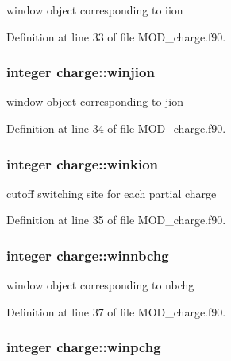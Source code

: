 window object corresponding to iion 



Definition at line 33 of file M\-O\-D\-\_\-charge.\-f90.

\hypertarget{classcharge_a8faac0f42a8281206457a781be89d809}{
\subsubsection[{winjion}]{\setlength{\rightskip}{0pt plus 5cm}integer charge\-::winjion}}\label{classcharge_a8faac0f42a8281206457a781be89d809}


window object corresponding to jion 



Definition at line 34 of file M\-O\-D\-\_\-charge.\-f90.

\hypertarget{classcharge_a54101485f254fd685c6f6d2ca96cfe86}{
\subsubsection[{winkion}]{\setlength{\rightskip}{0pt plus 5cm}integer charge\-::winkion}}\label{classcharge_a54101485f254fd685c6f6d2ca96cfe86}


cutoff switching site for each partial charge 



Definition at line 35 of file M\-O\-D\-\_\-charge.\-f90.

\hypertarget{classcharge_aeb8f3f6cb0def0ec0d81b6140b5042e6}{
\subsubsection[{winnbchg}]{\setlength{\rightskip}{0pt plus 5cm}integer charge\-::winnbchg}}\label{classcharge_aeb8f3f6cb0def0ec0d81b6140b5042e6}


window object corresponding to nbchg 



Definition at line 37 of file M\-O\-D\-\_\-charge.\-f90.

\hypertarget{classcharge_a9d412813e3be3dba41d38953d88afa3a}{
\subsubsection[{winpchg}]{\setlength{\rightskip}{0pt plus 5cm}integer charge\-::winpchg}}\label{classcharge_a9d412813e3be3dba41d38953d88afa3a}



